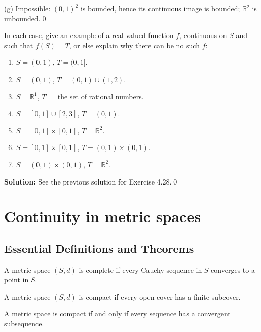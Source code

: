 (g) Impossible: $(0,1)^2$ is bounded, hence its continuous image is bounded; $\mathbb{R}^2$ is unbounded.\qed



\begin{problembox}
In each case, give an example of a real-valued function $f$, continuous on $S$ and such that $f(S) = T$, or else explain why there can be no such $f$:
\begin{enumerate}[label=(\alph*)]
\item $S = (0, 1)$, $T = (0, 1]$.
\item $S = (0, 1)$, $T = (0, 1) \cup (1, 2)$.
\item $S = \mathbb{R}^1$, $T =$ the set of rational numbers.
\item $S = [0, 1] \cup [2, 3]$, $T = (0, 1)$.
\item $S = [0, 1] \times [0, 1]$, $T = \mathbb{R}^2$.
\item $S = [0, 1] \times [0, 1]$, $T = (0, 1) \times (0, 1)$.
\item $S = (0, 1) \times (0, 1)$, $T = \mathbb{R}^2$.
\end{enumerate}
\end{problembox}

\bigskip\noindent\textbf{Solution:} See the previous solution for Exercise 4.28.\qed

\section{Continuity in metric spaces}

\subsection*{Essential Definitions and Theorems}

\begin{definition}
A metric space $(S,d)$ is complete if every Cauchy sequence in $S$ converges to a point in $S$.
\end{definition}

\begin{definition}
A metric space $(S,d)$ is compact if every open cover has a finite subcover.
\end{definition}

\begin{theorem}
A metric space is compact if and only if every sequence has a convergent subsequence.
\end{theorem}

